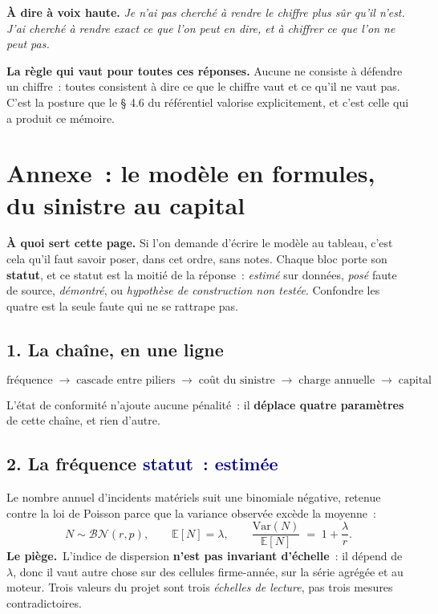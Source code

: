 \documentclass[11pt,a4paper]{article}
\newcommand{\lepiege}[1]{\smallskip\noindent\textcolor{accent}{\textbf{Le piège.}}\ #1\par}
\newcommand{\laphrase}[1]{\begin{phrasebox}\textbf{À dire à voix haute.} \emph{#1}\end{phrasebox}}
\begin{document}
\laphrase{Je n'ai pas cherché à rendre le chiffre plus sûr qu'il n'est. J'ai cherché à rendre
exact ce que l'on peut en dire, et à chiffrer ce que l'on ne peut pas.}

\begin{cle}
\textbf{La règle qui vaut pour toutes ces réponses.} Aucune ne consiste à défendre un chiffre~:
toutes consistent à dire ce que le chiffre vaut et ce qu'il ne vaut pas. C'est la posture que le
§ 4.6 du référentiel valorise explicitement, et c'est celle qui a produit ce mémoire.
\end{cle}

\newpage
\section*{Annexe~: le modèle en formules, du sinistre au capital}

\begin{cle}
\textbf{À quoi sert cette page.} Si l'on demande d'écrire le modèle au tableau, c'est cela qu'il
faut savoir poser, dans cet ordre, sans notes. Chaque bloc porte son \textbf{statut}, et ce statut
est la moitié de la réponse~: \emph{estimé} sur données, \emph{posé} faute de source,
\emph{démontré}, ou \emph{hypothèse de construction non testée}. Confondre les quatre est la
seule faute qui ne se rattrape pas.
\end{cle}

\subsection*{1. La chaîne, en une ligne}

\[
\text{fréquence} \;\longrightarrow\; \text{cascade entre piliers} \;\longrightarrow\;
\text{coût du sinistre} \;\longrightarrow\; \text{charge annuelle} \;\longrightarrow\;
\text{capital}
\]

\noindent L'état de conformité n'ajoute aucune pénalité~: il \textbf{déplace quatre paramètres} de
cette chaîne, et rien d'autre.

\subsection*{2. La fréquence \quad\small\textcolor{navy}{statut~: estimée}\normalsize}

Le nombre annuel d'incidents matériels suit une binomiale négative, retenue contre la loi de
Poisson parce que la variance observée excède la moyenne~:
\[
N \sim \mathcal{BN}(r,p), \qquad \mathbb{E}[N]=\lambda, \qquad
\frac{\mathrm{Var}(N)}{\mathbb{E}[N]} \;=\; 1+\frac{\lambda}{r}.
\]
\lepiege{L'indice de dispersion \textbf{n'est pas invariant d'échelle}~: il dépend de $\lambda$,
donc il vaut autre chose sur des cellules firme-année, sur la série agrégée et au moteur. Trois
valeurs du projet sont trois \emph{échelles de lecture}, pas trois mesures contradictoires.}
\end{document}
